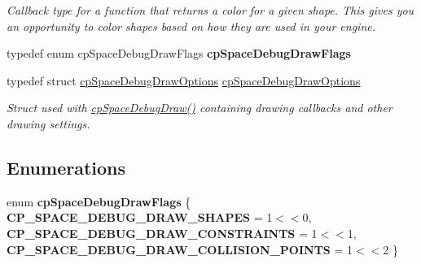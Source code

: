 \begin{DoxyCompactItemize}
\begin{DoxyCompactList}\small\item\em Callback type for a function that returns a color for a given shape. This gives you an opportunity to color shapes based on how they are used in your engine. \end{DoxyCompactList}\item 
\mbox{\label{group__cp_space_gaa625807338fd5ebd8f61463dead0c32b}} 
typedef enum cp\+Space\+Debug\+Draw\+Flags {\bfseries cp\+Space\+Debug\+Draw\+Flags}
\item 
\mbox{\label{group__cp_space_gabb44b3d40332bc5965e8dbd515caa71a}} 
typedef struct \mbox{\hyperlink{structcp_space_debug_draw_options}{cp\+Space\+Debug\+Draw\+Options}} \mbox{\hyperlink{group__cp_space_gabb44b3d40332bc5965e8dbd515caa71a}{cp\+Space\+Debug\+Draw\+Options}}
\begin{DoxyCompactList}\small\item\em Struct used with \mbox{\hyperlink{group__cp_space_ga02e8a34681aff3f29bd976e830f3b6da}{cp\+Space\+Debug\+Draw()}} containing drawing callbacks and other drawing settings. \end{DoxyCompactList}\end{DoxyCompactItemize}
\subsection*{Enumerations}
\begin{DoxyCompactItemize}
\item 
\mbox{\label{group__cp_space_ga12b09b00b23e09d770e4b2ab3980c69a}} 
enum {\bfseries cp\+Space\+Debug\+Draw\+Flags} \{ {\bfseries C\+P\+\_\+\+S\+P\+A\+C\+E\+\_\+\+D\+E\+B\+U\+G\+\_\+\+D\+R\+A\+W\+\_\+\+S\+H\+A\+P\+ES} = 1$<$$<$0, 
{\bfseries C\+P\+\_\+\+S\+P\+A\+C\+E\+\_\+\+D\+E\+B\+U\+G\+\_\+\+D\+R\+A\+W\+\_\+\+C\+O\+N\+S\+T\+R\+A\+I\+N\+TS} = 1$<$$<$1, 
{\bfseries C\+P\+\_\+\+S\+P\+A\+C\+E\+\_\+\+D\+E\+B\+U\+G\+\_\+\+D\+R\+A\+W\+\_\+\+C\+O\+L\+L\+I\+S\+I\+O\+N\+\_\+\+P\+O\+I\+N\+TS} = 1$<$$<$2
 \}
\end{DoxyCompactItemize}
